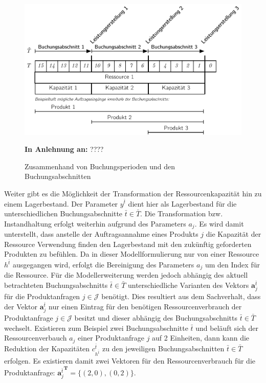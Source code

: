 \begin{figure}[h!]
  \begin{center}
    \includegraphics[width=130mm]{Bilder/Leistungsperioden.pdf}
    \caption{Zusammenhand von Buchungsperioden und den Buchungsabschnitten}  \label{IH}
    {\footnotesize \textbf{In Anlehnung an:} ????} 
  \end{center}
\end{figure}

Weiter gibt es die Möglichkeit der Transformation der Ressourcenkapazität hin zu einem Lagerbestand. Der Parameter $y^{\bar{t}}$ dient hier als Lagerbestand für die unterschiedlichen Buchungsabschnitte $\bar{t}\in\bar{T}$. Die Transformation bzw. Instandhaltung erfolgt weiterhin aufgrund des Parameters $a_j$. Es wird damit unterstellt, dass anstelle der Auftragsannahme eines Produkts $j$ die Kapazität der Ressource Verwendung finden den Lagerbestand mit den zukünftig geforderten Produkten zu befühlen. Da in dieser Modellformulierung nur von einer Ressource $h^{\bar{t}}$ ausgegangen wird, erfolgt die Bereinigung des Parameters $a_{j}$ um den Index für die Ressource. Für die Modellerweiterung werden jedoch abhängig des aktuell betrachteten Buchungsabschnitts $\bar{t}\in\bar{T}$ unterschiedliche Varianten des Vektors $\textbf{a}_{j}^{\bar{t}}$ für die Produktanfragen $j\in\mathcal{J}$ benötigt. Dies resultiert aus dem Sachverhalt, dass der Vektor $\textbf{a}_{j}^{\bar{t}}$ nur einen Eintrag für den benötigen Ressourcenverbrauch der Produktanfrage $j\in\mathcal{J}$ besitzt und dieser abhängig des Buchungsabschnitts $\bar{t}\in\bar{T}$ wechselt. Existieren zum Beispiel zwei Buchungsabschnitte $\bar{t}$ und beläuft sich der Ressourcenverbauch $a_j$ einer Produktanfrage $j$ auf 2 Einheiten, dann kann die Reduktion der Kapazitäten $c^{\bar{t}}_{h^{\bar{t}}}$ zu den jeweiligen Buchungsabschnitten $\bar{t}\in\bar{T}$ erfolgen. Es existieren damit zwei Vektoren für den Ressourcenverbrauch für die Produktanfrage: ${\textbf{a}_{j}^{\bar{t}}}^{\textbf{T}}=\{ (2,0), (0,2)\}$.

